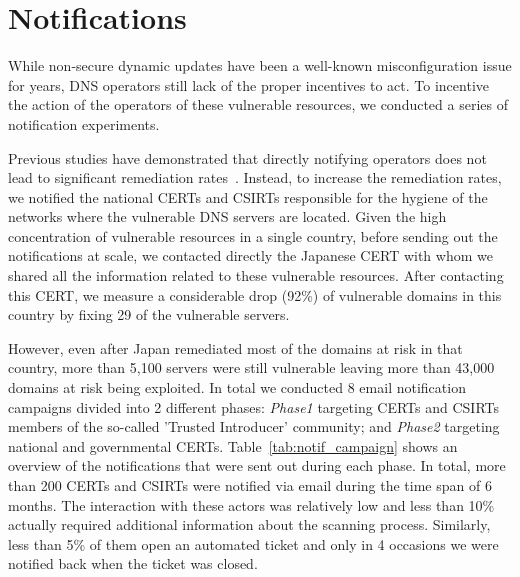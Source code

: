 
\section{Notifications}

While non-secure dynamic updates have been a well-known misconfiguration issue for years, DNS operators still lack of the proper incentives to act.
To incentive the action of the operators of these vulnerable resources, we conducted a series of notification experiments.

Previous studies have demonstrated that directly notifying  operators does not lead to significant remediation rates~\cite{cetin2017make}. Instead, to increase the remediation rates, we notified the national CERTs and CSIRTs responsible for the hygiene of the networks where the vulnerable DNS servers are located.
Given the high concentration of vulnerable resources in a single country, before sending out the notifications at scale, we contacted directly the Japanese CERT with whom we shared all the information related to these vulnerable resources. After contacting this CERT, we measure a considerable drop (92\%) of vulnerable domains in this country by fixing 29 of the vulnerable servers.


However, even after Japan remediated most of the domains at risk in that country, more than 5,100 servers were still vulnerable leaving more than 43,000 domains at risk being exploited.
In total we conducted 8 email notification campaigns divided into 2 different phases: \textit{Phase1} targeting CERTs and CSIRTs members of the so-called 'Trusted Introducer' community; and  \textit{Phase2} targeting national and governmental CERTs. Table~\ref{tab:notif_campaign} shows an overview of the notifications that were sent out during each phase. In total, more than 200 CERTs and CSIRTs were notified via email during the time span of 6 months. The interaction with these actors was relatively low and less than 10\% actually required additional information about the scanning process. Similarly, less than 5\% of them open an automated ticket and only in 4 occasions we were notified back when the ticket was closed.

